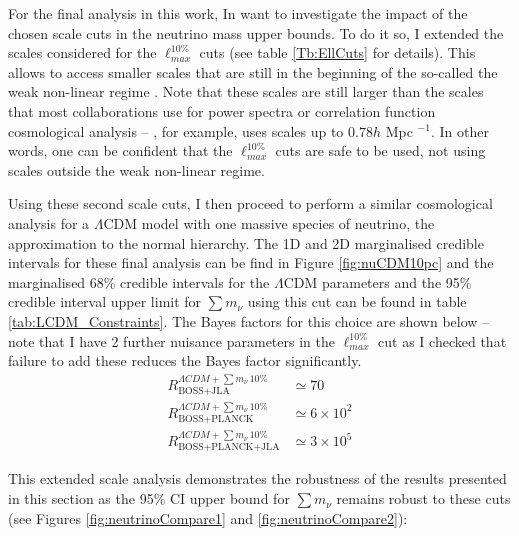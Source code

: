 \qquad For the final analysis in this work, In want to investigate the impact of the chosen scale cuts in the neutrino mass upper bounds. To do it so, I extended the scales considered for the $\ell_{max}^{10\%}$ cuts (see table \ref{Tb:EllCuts} for details). This allows to access smaller scales that are still in the beginning of the so-called the weak non-linear regime \citep{Thomas2010Neutr,Bird2012}. Note that these scales are still larger than the scales that most collaborations use for power spectra or correlation function cosmological analysis \citep{Ho2012,2016BOSSCosmology,2017MNRAS.465.1454H,2017arXiv170801530D} -- \cite{2017arXiv170801530D}, for example, uses scales up to $0.78h$ Mpc $^{-1}$. In other words, one can be confident that the $\ell_{max}^{10\%}$ cuts are safe to be used, not using scales outside the weak non-linear regime. 


\qquad Using these second scale cuts, I then proceed to perform a similar cosmological analysis for a $\Lambda$CDM model with one massive species of neutrino, the approximation to the normal hierarchy. The 1D and 2D marginalised credible intervals for these final analysis can be find in Figure \ref{fig:nuCDM10pc} and the marginalised 68\% credible intervals for the $\Lambda$CDM parameters and the 95\% credible interval upper limit for $\sum m_{\nu}$ using this cut can be found in table \ref{tab:LCDM_Constraints}. The Bayes factors for this choice are shown below -- note that I have 2 further nuisance parameters in the $\ell_{max}^{10\%}$ cut as I checked that failure to add these reduces the Bayes factor significantly.
\begin{align}
R_{\scriptscriptstyle\text{BOSS+JLA}}^{\Lambda CDM + \sum m_{\nu} \, 10\%} & \simeq 70  \\
R_{\scriptscriptstyle\text{BOSS+PLANCK}}^{\Lambda CDM +\sum m_{\nu} \, 10\%} & \simeq 6 \times 10^2 \\
R_{\scriptscriptstyle\text{BOSS+PLANCK+JLA}}^{\Lambda CDM +\sum m_{\nu} \, 10\%} & \simeq 3 \times 10^5
\end{align}

\qquad This extended scale analysis demonstrates the robustness of the results presented in this section as the 95\% CI upper bound for $\sum m_{\nu}$ remains robust to these cuts (see Figures \ref{fig:neutrinoCompare1} and \ref{fig:neutrinoCompare2}):



